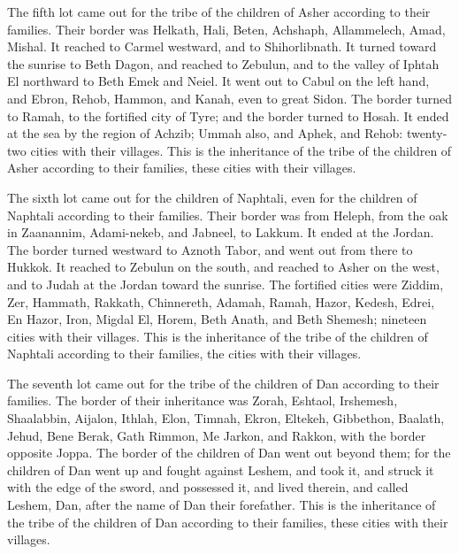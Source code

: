 \myverse{}The fifth lot came out for the tribe of the children of Asher
according to their families.
\myverse{}Their border was Helkath, Hali, Beten, Achshaph,
\myverse{}Allammelech, Amad, Mishal. It reached to Carmel westward, and to Shihorlibnath.
\myverse{}It turned toward the sunrise to Beth Dagon, and reached to Zebulun, and to
the valley of Iphtah El northward to Beth Emek and Neiel. It went out to Cabul on the left hand,
\myverse{}and Ebron, Rehob, Hammon, and Kanah, even to great Sidon.
\myverse{}The border turned to Ramah, to the fortified city of Tyre; and the border
turned to Hosah. It ended at the sea by the region of Achzib;
\myverse{}Ummah also, and Aphek, and Rehob: twenty-two cities with their villages.
\myverse{}This is the inheritance of the tribe of the children of Asher according to
their families, these cities with their villages.

\myverse{}The sixth lot came out for the children of Naphtali, even for
the children of Naphtali according to their families.
\myverse{}Their border was from Heleph, from the oak in Zaanannim, Adami-nekeb, and
Jabneel, to Lakkum. It ended at the Jordan.
\myverse{}The border turned westward to Aznoth Tabor, and went out from there to Hukkok.
It reached to Zebulun on the south, and reached to Asher on the west, and to Judah at the Jordan toward
the sunrise.
\myverse{}The fortified cities were Ziddim, Zer, Hammath, Rakkath, Chinnereth,
\myverse{}Adamah, Ramah, Hazor,
\myverse{}Kedesh, Edrei, En Hazor,
\myverse{}Iron, Migdal El, Horem, Beth Anath, and Beth Shemesh; nineteen cities with
their villages.
\myverse{}This is the inheritance of the tribe of the children of Naphtali according
to their families, the cities with their villages.

\myverse{}The seventh lot came out for the tribe of the children of Dan
according to their families.
\myverse{}The border of their inheritance was Zorah, Eshtaol, Irshemesh,
\myverse{}Shaalabbin, Aijalon, Ithlah,
\myverse{}Elon, Timnah, Ekron,
\myverse{}Eltekeh, Gibbethon, Baalath,
\myverse{}Jehud, Bene Berak, Gath Rimmon,
\myverse{}Me Jarkon, and Rakkon, with the border opposite Joppa.
\myverse{}The border of the children of Dan went out beyond them; for the children
of Dan went up and fought against Leshem, and took it, and struck it with the edge of the sword, and possessed
it, and lived therein, and called Leshem, Dan, after the name of Dan their forefather.
\myverse{}This is the inheritance of the tribe of the children of Dan according to
their families, these cities with their villages.

